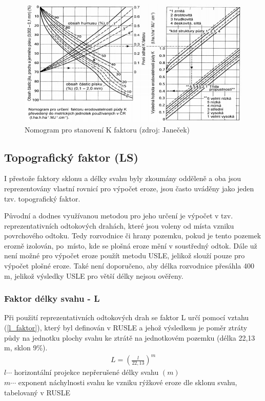 \begin{figure}[H]
    \centering
    \includegraphics[scale=0.85]{./pictures/k_faktor_nomogram.png}
      \caption[Nomogram pro stanovení K faktoru]{Nomogram pro
        stanovení K faktoru (zdroj: Janeček\cite{janecek2012})}
      \label{fig:k_faktor}
\end{figure}
\subsection{Topografický faktor (LS)}
I přestože faktory sklonu a délky svahu byly zkoumány odděleně a oba
jsou reprezentovány vlastní rovnicí pro výpočet eroze, jsou často
uváděny jako jeden tzv. topografický faktor.\cite{usle1978}

Původní a dodnes využívanou metodou pro jeho určení je výpočet v
tzv. reprezentativních odtokových drahách, které jsou voleny od místa
vzniku povrchového odtoku. Tedy rozvodnice či hrany pozemku, pokud je
tento pozemek erozně izolován, po~místo, kde se plošná eroze mění v
soustředný odtok. Dále už není možné pro výpočet eroze použít metodu
USLE, jelikož slouží pouze pro výpočet plošné eroze. Také není
doporučeno, aby délka rozvodnice přesáhla 400 m, jelikož výsledky USLE
pro větší délky nejsou ověřeny.\cite{janecek2012}

\subsubsection{Faktor délky svahu - L} 
Při použití reprezentativních odtokových drah se faktor L určí pomocí
vztahu (\ref{l_faktor}), který byl definován v RUSLE\cite{rusle1997} a
jehož výsledkem je poměr ztráty půdy na jednotku plochy svahu ke
ztrátě na jednotkovém pozemku (délka 22,13 m, sklon
9\%).\cite{janecek2012}
\begin{align}
   \label{l_faktor} L=\left( \frac{l}{22,13} \right)^m
\end{align}
\hspace*{2cm}$l \cdots$ horizontální projekce nepřerušené délky svahu
$\left( m \right)$ \\
\hspace*{2cm}$m \cdots$ exponent náchylnosti svahu ke vzniku rýžkové
eroze dle sklonu svahu, tabelovaný v RUSLE\cite{rusle1997} \\
